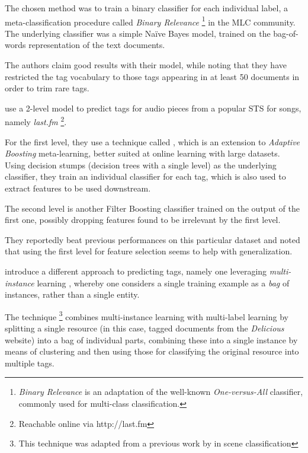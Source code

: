 The chosen method was to train a binary classifier for each individual label, a meta-classification procedure called \textit{Binary Relevance} \footnote{\textit{Binary Relevance} is an adaptation of the well-known \textit{One-versus-All} \citep{rifkin_klautau_2004} classifier, commonly used for multi-class classification.} in the MLC community. The underlying classifier was a simple Naïve Bayes model, trained on the bag-of-words representation of the text documents.

The authors claim good results with their model, while noting that they have restricted the tag vocabulary to those tags appearing in at least 50 documents in order to trim rare tags.

\cite{bertin-mahieux_etal_2008} use a 2-level model to predict tags for audio pieces from a popular STS for songs, namely \textit{last.fm} \footnote{Reachable online via http://last.fm}.

For the first level, they use a technique called \citet{Filter Boosting}, which is an extension to \textit{Adaptive Boosting} meta-learning, better suited at online learning with large datasets. Using decision stumps (decision trees with a single level) as the underlying classifier, they train an individual classifier for each tag, which is also used to extract features to be used downstream.

The second level is another Filter Boosting classifier trained on the output of the first one, possibly dropping features found to be irrelevant by the first level.

They reportedly beat previous performances on this particular dataset and noted that using the first level for feature selection seems to help with generalization.

\cite{shen_etal_2009} introduce a different approach to predicting tags, namely one leveraging \textit{multi-instance} learning \citep{dietterich_etal_1997}, whereby one considers a single training example as a \textit{bag} of instances, rather than a single entity.

The technique \footnote{This technique was adapted from a previous work by \cite{zhou_zhang_2006} in scene classification} combines multi-instance learning with multi-label learning by splitting a single resource (in this case, tagged documents from the \textit{Delicious} website) into a bag of individual parts, combining these into a single instance by means of clustering and then using those for classifying the original resource into multiple tags.

